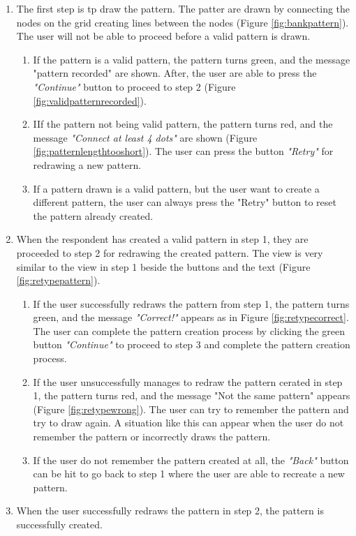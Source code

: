       \begin{enumerate}[leftmargin=0.3in]
        \item The first step is tp draw the pattern. The patter are drawn by connecting the nodes on the grid creating lines between the nodes (Figure \ref{fig:bankpattern}). The user will not be able to proceed before a valid pattern is drawn.
          \begin{enumerate}
            \item If the pattern is a valid pattern, the pattern turns green, and the message "pattern recorded" are shown. After, the user are able to press the {\it "Continue"} button to proceed to step 2 (Figure \ref{fig:validpatternrecorded}). 
            \item IIf the pattern not being valid pattern, the pattern turns red, and the message {\it "Connect at least 4 dots"} are shown (Figure \ref{fig:patternlengthtooshort}). The user can press the button {\it "Retry"}  for redrawing a new pattern.
            \item If a pattern drawn is a valid pattern, but the user want to create a different pattern, the user can always press the "Retry" button to reset the pattern already created. 
          \end{enumerate}
        \item When the respondent has created a valid pattern in step 1, they are proceeded to step 2 for redrawing the created pattern. The view is very similar to the view in step 1 beside the buttons and the text (Figure \ref{fig:retypepattern}).
          \begin{enumerate}
            \item If the user successfully redraws the pattern from step 1, the pattern turns green, and the message {\it "Correct!"} appears as in Figure \ref{fig:retypecorrect}. The user can complete the pattern creation process by clicking the green button {\it "Continue"} to proceed to step 3 and complete the pattern creation process.
            \item If the user unsuccessfully manages to redraw the pattern cerated in step 1, the pattern turns red, and the message "Not the same pattern" appears (Figure \ref{fig:retypewrong}). The user can try to remember the pattern and try to draw again. A situation like this can appear when the user do not remember the pattern or incorrectly draws the pattern.    
            \item If the user do not remember the pattern created at all, the {\it "Back"} button can be hit to go back to step 1 where the user are able to recreate a new pattern.  
          \end{enumerate}
        \item When the user successfully redraws the pattern in step 2, the pattern is successfully created.
      \end{enumerate}

